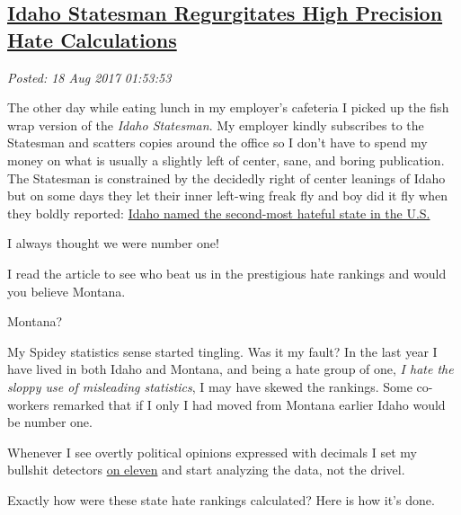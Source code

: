 %

\subsection*{\href{http://analyzethedatanotthedrivel.org/2017/08/17/idaho-statesman-regurgitates-high-precision-hate-calculations/}{Idaho Statesman Regurgitates High Precision Hate Calculations}}


\noindent\emph{Posted: 18 Aug 2017 01:53:53}
\vspace{6pt}

The other day while eating lunch in my employer's cafeteria I picked up
the fish wrap version of the \emph{Idaho Statesman}. My employer kindly
subscribes to the Statesman and scatters copies around the office so I
don't have to spend my money on what is usually a slightly left of
center, sane, and boring publication. The Statesman is constrained by
the decidedly right of center leanings of Idaho but on some days they
let their inner left-wing freak fly and boy did it fly when they boldly
reported:
\href{http://www.idahostatesman.com/news/state/idaho/article167378712.html}{Idaho
named the second-most hateful state in the U.S.}

I always thought we were number one!

I read the article to see who beat us in the prestigious hate rankings
and would you believe Montana.

Montana?

My Spidey statistics sense started tingling. Was it my fault? In the
last year I have lived in both Idaho and Montana, and being a hate group
of one, \emph{I hate the sloppy use of misleading statistics}, I may
have skewed the rankings. Some co-workers remarked that if I only I had
moved from Montana earlier Idaho would be number one.

Whenever I see overtly political opinions expressed with decimals I set
my bullshit detectors
\href{https://www.youtube.com/watch?v=4xgx4k83zzc}{on eleven} and start
analyzing the data, not the drivel.

Exactly how were these state hate rankings calculated? Here is how it's
done.

